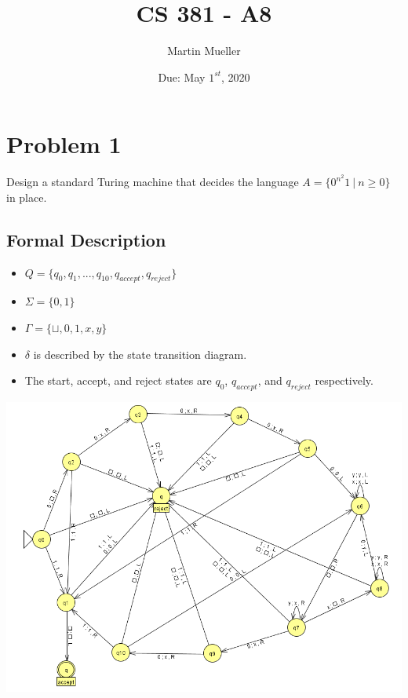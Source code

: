 \documentclass[11pt letter]{article}
\title{CS 381 - A8}
\author{Martin Mueller}
\date{Due: May $1^{st}$, 2020}
\begin{document}
\maketitle

\section{Problem 1}
Design a standard Turing machine that decides the language $A = \{0^{n^{2}}1 \ | \ n \ge 0\}$ in place.

\subsection{Formal Description}
\begin{itemize}
    \item $Q = \{q_0, q_1, ..., q_{10}, q_{accept}, q_{reject}\}$
    \item $\Sigma = \{0, 1\}$
    \item $\Gamma = \{\sqcup, 0, 1, x, y\}$
    \item $\delta$ is described by the state transition diagram.
    \item The start, accept, and reject states are $q_{0}$, $q_{accept}$, and $q_{reject}$ respectively.
\end{itemize}
\begin{center}
    \includegraphics[scale=0.7]{TM.png}
\end{center}
\end{document}
